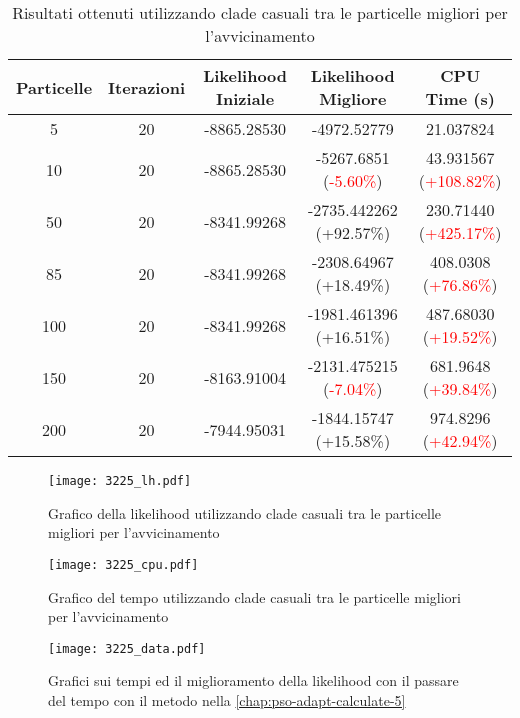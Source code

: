 \begin{table}[!h]
  \centering
  \begin{tabular}{*{5}{c}}
    Particelle & Iterazioni & Likelihood Iniziale & Likelihood Migliore & CPU Time (s) \\ \midrule \midrule
    5 & 20 & -8865.28530 & -4972.52779 & 21.037824 \\
    10 & 20 & -8865.28530 & -5267.6851 (\textcolor{red}{-5.60\%}) & 43.931567 (\textcolor{red}{+108.82\%}) \\
    50 & 20 & -8341.99268 & -2735.442262 (\textcolor{ao(english)}{+92.57\%}) & 230.71440 (\textcolor{red}{+425.17\%}) \\
    85 & 20 & -8341.99268 & -2308.64967 (\textcolor{ao(english)}{+18.49\%}) & 408.0308 (\textcolor{red}{+76.86\%}) \\
    100 & 20 & -8341.99268 & -1981.461396 (\textcolor{ao(english)}{+16.51\%}) & 487.68030 (\textcolor{red}{+19.52\%}) \\
    150 & 20 & -8163.91004 & -2131.475215 (\textcolor{red}{-7.04\%}) & 681.9648 (\textcolor{red}{+39.84\%}) \\
    200 & 20 & -7944.95031 & -1844.15747 (\textcolor{ao(english)}{+15.58\%}) & 974.8296 (\textcolor{red}{+42.94\%}) \\
  \end{tabular}
  \caption{Risultati ottenuti utilizzando clade casuali tra le particelle migliori per l'avvicinamento}
  \label{tab:pso-adapt-calculate-5-table}
\end{table}

\begin{figure}[!h]
  \centering
  \begin{minipage}{.45 \textwidth}
  \centering
  \texttt{[image: 3225\_lh.pdf]}
  \caption{Grafico della likelihood utilizzando clade casuali tra le particelle migliori per l'avvicinamento}
  \end{minipage}
  \begin{minipage}{.45 \textwidth}
    \centering
    \texttt{[image: 3225\_cpu.pdf]}
    \caption{Grafico del tempo utilizzando clade casuali tra le particelle migliori per l'avvicinamento}
  \end{minipage}
  \label{fig:pso-adapt-calculate-1-graph}
\end{figure}

\begin{figure}[!h]
  \centering
  \texttt{[image: 3225\_data.pdf]}
  \caption{Grafici sui tempi ed il miglioramento della likelihood con il passare del tempo con il metodo nella \autoref{chap:pso-adapt-calculate-5}}
  \label{fig:pso-adapt-calculate-4-data}
\end{figure}

